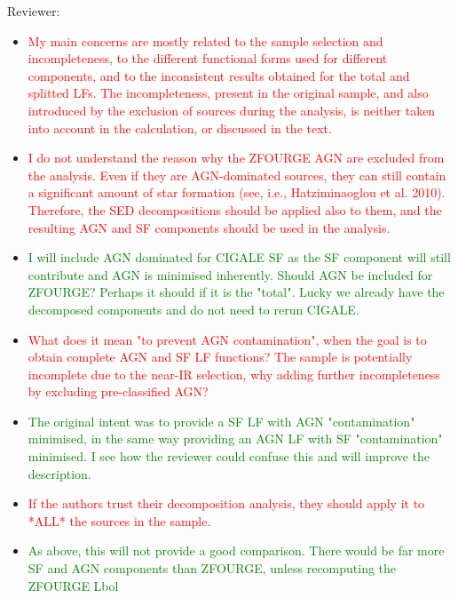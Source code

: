 Reviewer:
\begin{itemize}
    \item \textcolor{red}{My main concerns are mostly related to the sample selection and incompleteness, to the different functional forms used for different components, and to the inconsistent results obtained for the total and splitted LFs. The incompleteness, present in the original sample, and also introduced by the exclusion of sources during the analysis, is neither taken into account in the calculation, or discussed in the text.}
    
    \item \textcolor{red}{I do not understand the reason why the ZFOURGE AGN are excluded from the analysis. Even if they are AGN-dominated sources, they can still contain a significant amount of star formation (see, i.e., Hatziminaoglou et al. 2010). Therefore, the SED decompositions should be applied also to them, and the resulting AGN and SF components should be used in the analysis.}
    \item \textcolor{Green}{I will include AGN dominated for CIGALE SF as the SF component will still contribute and AGN is minimised inherently. Should AGN be included for ZFOURGE? Perhaps it should if it is the "total". Lucky we already have the decomposed components and do not need to rerun CIGALE.}
    \vspace{0.25cm}
    
    \item \textcolor{red}{What does it mean "to prevent AGN contamination", when the goal is to obtain complete AGN and SF LF functions? The sample is potentially incomplete due to the near-IR selection, why adding further incompleteness by excluding pre-classified AGN?}
    \item \textcolor{Green}{The original intent was to provide a SF LF with AGN "contamination" minimised, in the same way providing an AGN LF with SF "contamination" minimised. I see how the reviewer could confuse this and will improve the description.}
    \vspace{0.25cm}
    
    \item \textcolor{red}{If the authors trust their decomposition analysis, they should apply it to *ALL* the sources in the sample.}
    \item \textcolor{Green}{As above, this will not provide a good comparison. There would be far more SF and AGN components than ZFOURGE, unless recomputing the ZFOURGE Lbol}
    \vspace{0.25cm}
    

\end{itemize}
